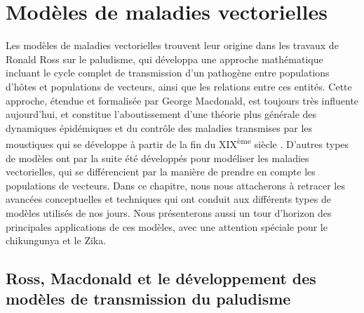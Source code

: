 \chapter{Modèles de maladies vectorielles}
\chaptermark{}



Les modèles de maladies vectorielles trouvent leur origine dans les travaux de Ronald Ross sur le paludisme, qui développa une approche mathématique incluant le cycle complet de transmission d'un pathogène entre populations d'hôtes et populations de vecteurs, ainsi que les relations entre ces entités.
Cette approche, étendue et formalisée par George Macdonald, est toujours très influente aujourd'hui, et constitue l'aboutissement d'une théorie plus générale des dynamiques épidémiques et du contrôle des maladies transmises par les moustiques qui se développe à partir de la fin du XIX\textsuperscript{ème} siècle \cite{smith2012ross}.
D'autres types de modèles ont par la suite été développés pour modéliser les maladies vectorielles, qui se différencient par la manière de prendre en compte les populations de vecteurs.
Dans ce chapitre, nous nous attacherons à retracer les avancées conceptuelles et techniques qui ont conduit aux différents types de modèles utilisés de nos jours.
Nous présenterons aussi un tour d'horizon des principales applications de ces modèles, avec une attention spéciale pour le chikungunya et le Zika.

\section[Ross, Macdonald \& le paludisme]{Ross, Macdonald et le développement des modèles de transmission du paludisme}

